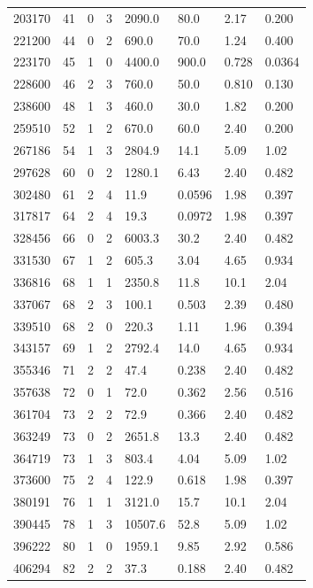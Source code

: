 \documentclass[preview]{standalone}
\begin{document}
{{\begin{tabular}{L{1.2cm}C{1.2cm} C{0.3cm}C{0.5cm} C{1.4cm}C{1.4cm} C{1.4cm}C{1.4cm}}
  203170  &    41  & 0     &  3 &  2090.0  & 80.0  & 2.17 &  0.200   \\ 
  221200  &    44  & 0     &  2 &  690.0  & 70.0  & 1.24 &  0.400   \\ 
  223170  &    45  & 1     &  0 &  4400.0  & 900.0  & 0.728 &  0.0364   \\ 
  228600  &    46  & 2     &  3 &  760.0  & 50.0  & 0.810 &  0.130   \\ 
  238600  &    48  & 1     &  3 &  460.0  & 30.0  & 1.82 &  0.200   \\ 
  259510  &    52  & 1     &  2 &  670.0  & 60.0  & 2.40 &  0.200   \\ 
  267186  &    54  & 1     &  3 &  2804.9  & 14.1  & 5.09 &  1.02   \\ 
  297628  &    60  & 0     &  2 &  1280.1  & 6.43  & 2.40 &  0.482   \\ 
  302480  &    61  & 2     &  4 &  11.9  & 0.0596  & 1.98 &  0.397   \\ 
  317817  &    64  & 2     &  4 &  19.3  & 0.0972  & 1.98 &  0.397   \\ 
  328456  &    66  & 0     &  2 &  6003.3  & 30.2  & 2.40 &  0.482   \\ 
  331530  &    67  & 1     &  2 &  605.3  & 3.04  & 4.65 &  0.934   \\ 
  336816  &    68  & 1     &  1 &  2350.8  & 11.8  & 10.1 &  2.04   \\ 
  337067  &    68  & 2     &  3 &  100.1  & 0.503  & 2.39 &  0.480   \\ 
  339510  &    68  & 2     &  0 &  220.3  & 1.11  & 1.96 &  0.394   \\ 
  343157  &    69  & 1     &  2 &  2792.4  & 14.0  & 4.65 &  0.934   \\ 
  355346  &    71  & 2     &  2 &  47.4  & 0.238  & 2.40 &  0.482   \\ 
  357638  &    72  & 0     &  1 &  72.0  & 0.362  & 2.56 &  0.516   \\ 
  361704  &    73  & 2     &  2 &  72.9  & 0.366  & 2.40 &  0.482   \\ 
  363249  &    73  & 0     &  2 &  2651.8  & 13.3  & 2.40 &  0.482   \\ 
  364719  &    73  & 1     &  3 &  803.4  & 4.04  & 5.09 &  1.02   \\ 
  373600  &    75  & 2     &  4 &  122.9  & 0.618  & 1.98 &  0.397   \\ 
  380191  &    76  & 1     &  1 &  3121.0  & 15.7  & 10.1 &  2.04   \\ 
  390445  &    78  & 1     &  3 &  10507.6  & 52.8  & 5.09 &  1.02   \\ 
  396222  &    80  & 1     &  0 &  1959.1  & 9.85  & 2.92 &  0.586   \\ 
  406294  &    82  & 2     &  2 &  37.3  & 0.188  & 2.40 &  0.482   \\ 
\hline 
\end{tabular} 

}}
\end{document}
